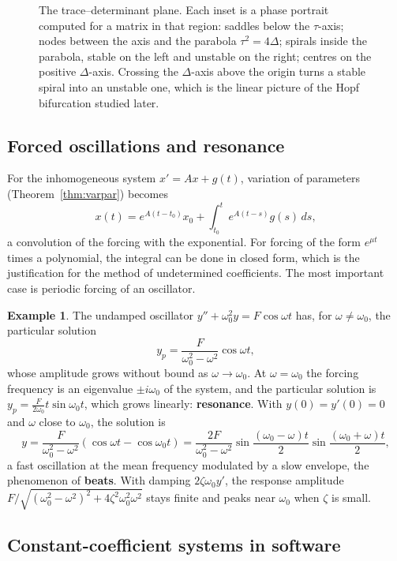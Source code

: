 \documentclass[11pt,a4paper]{article}
\numberwithin{equation}{section}
\theoremstyle{definition}
\newtheorem{exa}[thm]{Example}
\begin{document}
\begin{figure}[H]
\begin{tikzpicture}[x=1cm,y=1cm,
  mini/.style={fill=white,draw=gray!50,rounded corners=2pt}]
\end{tikzpicture}
\caption{The trace--determinant plane. Each inset is a phase portrait computed for a matrix in that region: saddles below the $\tau$-axis; nodes between the axis and the parabola
$\tau^2 = 4\Delta$; spirals inside the parabola, stable on the left and unstable on the right; centres on the positive $\Delta$-axis. Crossing the $\Delta$-axis above the origin turns a stable spiral into an
unstable one, which is the linear picture of the Hopf bifurcation studied later.}
\label{fig:tracedet}
\end{figure}

\subsection{Forced oscillations and resonance}
\label{ssec:resonance}

For the inhomogeneous system $x' = Ax + g(t)$, variation of parameters (Theorem~\ref{thm:varpar}) becomes
\[
x(t) = e^{A(t - t_0)}x_0 + \int_{t_0}^te^{A(t - s)}g(s)\,ds ,
\]
a convolution of the forcing with the exponential. For forcing of the form $e^{\mu t}$ times a polynomial, the integral can be done in closed form, which is the justification for the
method of undetermined coefficients. The most important case is periodic forcing of an oscillator.

\begin{exa}
\label{ex:resonance}
The undamped oscillator $y'' + \omega_0^2y = F\cos\omega t$ has, for $\omega \neq \omega_0$, the particular solution
\[
y_p = \frac{F}{\omega_0^2 - \omega^2}\cos\omega t ,
\]
whose amplitude grows without bound as $\omega \to \omega_0$. At $\omega = \omega_0$ the forcing frequency is an eigenvalue $\pm i\omega_0$ of the system, and the particular solution is
$y_p = \frac{F}{2\omega_0}t\sin\omega_0t$, which grows linearly: \textbf{resonance}. With $y(0) = y'(0) = 0$ and $\omega$ close to $\omega_0$, the solution is
\[
y = \frac{F}{\omega_0^2 - \omega^2}(\cos\omega t - \cos\omega_0t) = \frac{2F}{\omega_0^2 - \omega^2}\sin\frac{(\omega_0 - \omega)t}{2}\sin\frac{(\omega_0 + \omega)t}{2} ,
\]
a fast oscillation at the mean frequency modulated by a slow envelope, the phenomenon of \textbf{beats}. With damping $2\zeta\omega_0y'$, the response amplitude
$F/\sqrt{(\omega_0^2 - \omega^2)^2 + 4\zeta^2\omega_0^2\omega^2}$ stays finite and peaks near $\omega_0$ when $\zeta$ is small.
\end{exa}

\subsection{Constant-coefficient systems in software}
\label{ssec:software5}
\end{document}
